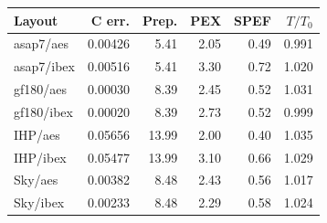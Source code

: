 \begin{tabular}{lrrrrr}
\toprule
Layout & C err. & Prep. & PEX & SPEF & $T/T_0$ \\
\midrule
asap7/aes & 0.00426 & 5.41 & 2.05 & 0.49 & 0.991 \\
asap7/ibex & 0.00516 & 5.41 & 3.30 & 0.72 & 1.020 \\
gf180/aes & 0.00030 & 8.39 & 2.45 & 0.52 & 1.031 \\
gf180/ibex & 0.00020 & 8.39 & 2.73 & 0.52 & 0.999 \\
IHP/aes & 0.05656 & 13.99 & 2.00 & 0.40 & 1.035 \\
IHP/ibex & 0.05477 & 13.99 & 3.10 & 0.66 & 1.029 \\
Sky/aes & 0.00382 & 8.48 & 2.43 & 0.56 & 1.017 \\
Sky/ibex & 0.00233 & 8.48 & 2.29 & 0.58 & 1.024 \\
\bottomrule
\end{tabular}
